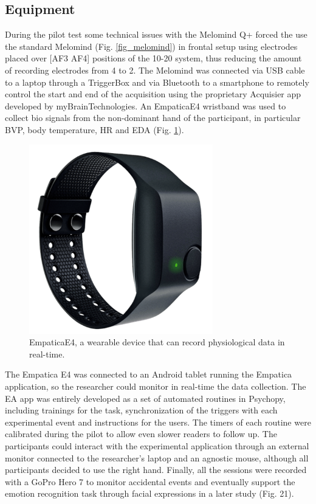 \subsection{Equipment}
\label{sec:equipment}
During the pilot test some technical issues with the Melomind Q+ forced the use the standard Melomind (Fig. \ref{fig_melomind}) in frontal setup using electrodes placed over [AF3 AF4] positions of the 10-20 system, thus reducing the amount of recording electrodes from 4 to 2. The Melomind was connected via USB cable to a laptop through a TriggerBox and via Bluetooth to a smartphone to remotely control the start and end of the acquisition using the proprietary Acquisier app developed by myBrainTechnologies. An EmpaticaE4  wristband was used to collect bio signals from the non-dominant hand of the participant, in particular \ac{BVP}, body temperature, \ac{HR} and \ac{EDA} (Fig. \ref{fig_empatica}). 

\begin{figure}[h!]
\includegraphics[width=8cm]{img/methods/empaticaE4.png}
\centering
\caption{EmpaticaE4, a wearable device that can record physiological data in real-time.} \label{fig_empatica}
\end{figure}

The Empatica E4 was connected to an Android tablet running the Empatica application, so the researcher could monitor in real-time the data collection. The \ac{EA} app was entirely developed as a set of automated routines in Psychopy, including trainings for the task, synchronization of the triggers with each experimental event and instructions for the users. The timers of each routine were calibrated during the pilot to allow even slower readers to follow up. The participants could interact with the experimental application through an external monitor connected to the researcher’s laptop and an agnostic mouse, although all participants decided to use the right hand. Finally, all the sessions were recorded with a GoPro Hero 7 to monitor accidental events and eventually support the emotion recognition task through facial expressions in a later study (Fig. 21). 

